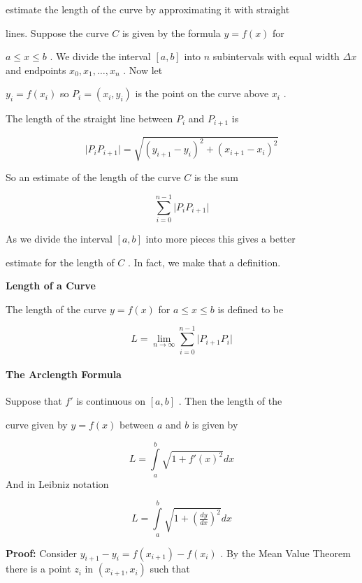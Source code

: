estimate the length of the curve by approximating it with straight

lines. Suppose the curve $C$ is given by the formula $y=f(x)$ for

$a\le x\le b$ . We divide the interval $[a,b]$ into $n$ subintervals with equal width $\Delta x$ and endpoints $x _0,x _1,\ldots,x _n$ . Now let

$y _i=f(x _i)$ so $P _i=(x _i,y _i)$ is the point on the curve above $x _i$ .

The length of the straight line between $P _i$ and $P _{i+1}$ is



$$\bigl|P _iP _{i+1}\bigr|=\sqrt{(y _{i+1}-y _i)^2+(x _{i+1}-x _i)^2}$$



So an estimate of the length of the curve $C$ is the sum



$$\sum _{i=0}^{n-1}\bigl|P _iP _{i+1}\bigr|$$



As we divide the interval $[a,b]$ into more pieces this gives a better

estimate for the length of $C$ . In fact, we make that a definition.



\textbf{Length of a Curve}



The length of the curve $y=f(x)$ for $a\le x\le b$ is defined to be



$$L=\lim _{n\to\infty}\sum _{i=0}^{n-1}\bigl|P _{i+1}P _i\bigr|$$



\paragraph{The Arclength Formula}



Suppose that $f'$ is continuous on $[a,b]$ . Then the length of the

curve given by $y=f(x)$ between $a$ and $b$ is given by



$$L=\int\limits _a^b \sqrt{1+f'(x)^2}dx$$ And in Leibniz notation



$$L=\int\limits _a^b \sqrt{1+\left(\tfrac{dy}{dx}\right)^2}dx$$



\textbf{Proof:} Consider $y _{i+1}-y _i=f(x _{i+1})-f(x _i)$ . By the Mean Value Theorem there is a point $z _i$ in $(x _{i+1},x _i)$ such that



